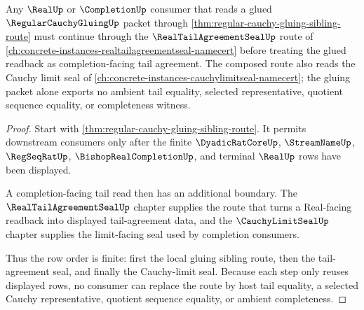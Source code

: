\begin{theorem}
\label{thm:regular-cauchy-gluing-tail-agreement-composition}
Any $\RealUp$ or $\CompletionUp$ consumer that reads a glued $\RegularCauchyGluingUp$ packet through \autoref{thm:regular-cauchy-gluing-sibling-route} must continue through the $\RealTailAgreementSealUp$ route of \autoref{ch:concrete-instances-realtailagreementseal-namecert} before treating the glued readback as completion-facing tail agreement. The composed route also reads the Cauchy limit seal of \autoref{ch:concrete-instances-cauchylimitseal-namecert}; the gluing packet alone exports no ambient tail equality, selected representative, quotient sequence equality, or completeness witness.
\end{theorem}
\begin{proof}
Start with \autoref{thm:regular-cauchy-gluing-sibling-route}. It permits downstream consumers only after the finite $\DyadicRatCoreUp$, $\StreamNameUp$, $\RegSeqRatUp$, $\BishopRealCompletionUp$, and terminal $\RealUp$ rows have been displayed.

A completion-facing tail read then has an additional boundary. The $\RealTailAgreementSealUp$ chapter supplies the route that turns a Real-facing readback into displayed tail-agreement data, and the $\CauchyLimitSealUp$ chapter supplies the limit-facing seal used by completion consumers.

Thus the row order is finite: first the local gluing sibling route, then the tail-agreement seal, and finally the Cauchy-limit seal. Because each step only reuses displayed rows, no consumer can replace the route by host tail equality, a selected Cauchy representative, quotient sequence equality, or ambient completeness.
\end{proof}
